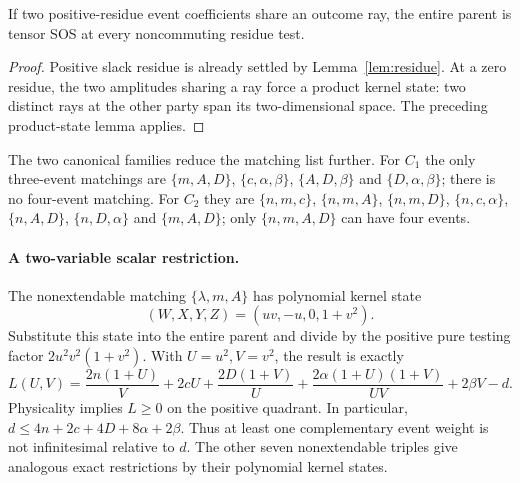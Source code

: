 \begin{corollary}
If two positive-residue event coefficients share an outcome ray, the entire parent is tensor SOS at every noncommuting residue test.
\end{corollary}
\begin{proof}
Positive slack residue is already settled by Lemma~\ref{lem:residue}. At a zero residue, the two amplitudes sharing a ray force a product kernel state: two distinct rays at the other party span its two-dimensional space. The preceding product-state lemma applies.
\end{proof}

The two canonical families reduce the matching list further. For $C_1$ the only three-event matchings are $\{m,A,D\}$, $\{c,\alpha,\beta\}$, $\{A,D,\beta\}$ and $\{D,\alpha,\beta\}$; there is no four-event matching. For $C_2$ they are $\{n,m,c\}$, $\{n,m,A\}$, $\{n,m,D\}$, $\{n,c,\alpha\}$, $\{n,A,D\}$, $\{n,D,\alpha\}$ and $\{m,A,D\}$; only $\{n,m,A,D\}$ can have four events.

\paragraph{A two-variable scalar restriction.}
The nonextendable matching $\{\lambda,m,A\}$ has polynomial kernel state
\[
(W,X,Y,Z)=(uv,-u,0,1+v^2).
\]
Substitute this state into the entire parent and divide by the positive pure testing factor $2u^2v^2(1+v^2)$. With $U=u^2,V=v^2$, the result is exactly
\[
L(U,V)=\frac{2n(1+U)}V+2cU+\frac{2D(1+V)}U
 +\frac{2\alpha(1+U)(1+V)}{UV}+2\beta V-d.
\]
Physicality implies $L\ge0$ on the positive quadrant. In particular,
$d\le4n+2c+4D+8\alpha+2\beta$. Thus at least one complementary event weight is not infinitesimal relative to $d$. The other seven nonextendable triples give analogous exact restrictions by their polynomial kernel states.


